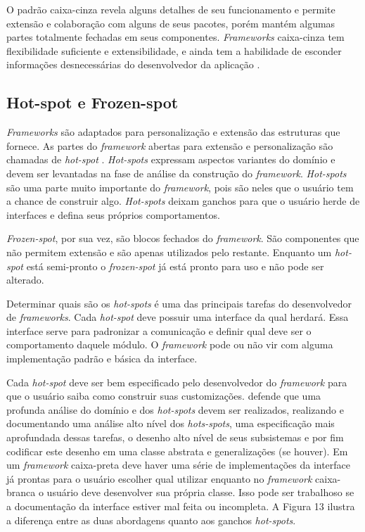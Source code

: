O padrão caixa-cinza revela alguns detalhes de seu funcionamento e permite extensão e colaboração com alguns de seus pacotes, porém mantém algumas partes totalmente fechadas em seus componentes. \textit{Frameworks} caixa-cinza tem flexibilidade suficiente e extensibilidade, e ainda tem a habilidade de esconder informações desnecessárias do desenvolvedor da aplicação \cite{Fayad1999}.

\subsection{Hot-spot e Frozen-spot}

\textit{Frameworks} são adaptados para personalização e extensão das estruturas que fornece. As partes do \textit{framework} abertas para extensão e personalização são chamadas de \textit{hot-spot} \cite{Fayad1999}. \textit{Hot-spots} expressam aspectos variantes do domínio e devem ser levantadas na fase de análise da construção do \textit{framework}. \textit{Hot-spots} são uma parte muito importante do \textit{framework}, pois são neles que o usuário tem a chance de construir algo. \textit{Hot-spots} deixam ganchos para que o usuário herde de interfaces e defina seus próprios comportamentos.

\textit{Frozen-spot}, por sua vez, são blocos fechados do \textit{framework}. São componentes que não permitem extensão e são apenas utilizados pelo restante. Enquanto um \textit{hot-spot} está semi-pronto o \textit{frozen-spot} já está pronto para uso e não pode ser alterado.

Determinar quais são os \textit{hot-spots} é uma das principais tarefas do desenvolvedor de \textit{frameworks}. Cada \textit{hot-spot} deve possuir uma interface da qual herdará. Essa interface serve para padronizar a comunicação e definir qual deve ser o comportamento daquele módulo. O \textit{framework} pode ou não vir com alguma implementação padrão e básica da interface.

Cada \textit{hot-spot} deve ser bem especificado pelo desenvolvedor do \textit{framework} para que o usuário saiba como construir suas customizações. \cite{Fayad1999} defende que uma profunda análise do domínio e dos \textit{hot-spots} devem ser realizados, realizando e documentando uma análise alto nível dos \textit{hots-spots}, uma especificação mais aprofundada dessas tarefas, o desenho alto nível de seus subsistemas e por fim codificar este desenho em uma classe abstrata e generalizações (se houver). Em um \textit{framework} caixa-preta deve haver uma série de implementações da interface já prontas para o usuário escolher qual utilizar enquanto no \textit{framework} caixa-branca o usuário deve desenvolver sua própria classe. Isso pode ser trabalhoso se a documentação da interface estiver mal feita ou incompleta. A Figura 13 ilustra a diferença entre as duas abordagens quanto aos ganchos \textit{hot-spots}.

